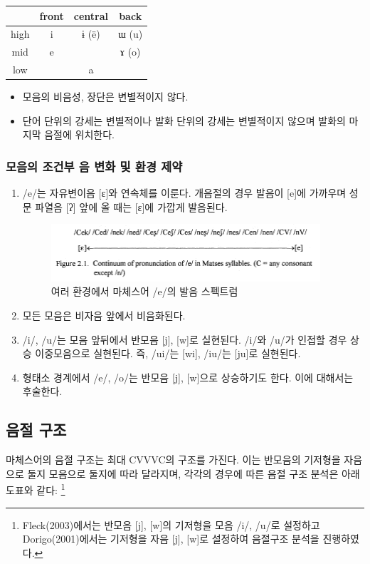 \begin{center}
\begin{tabular}{|c|c|c|c|}
\hline
	& front	& central	& back	\\ \hline
high	& i 		& ɨ  (ë)	& ɯ	(u)	\\ \hline
mid	& e		& 		& ɤ	(o)	\\ \hline
low	& 		& a 		&		\\
\hline
\end{tabular}
\end{center}

\begin{itemize}
\item 모음의 비음성, 장단은 변별적이지 않다. 
\item 단어 단위의 강세는 변별적이나 발화 단위의 강세는 변별적이지 않으며 발화의 마지막 음절에 위치한다. 
\end{itemize}

\subsubsection{모음의 조건부 음 변화 및 환경 제약}
\begin{enumerate}
\item /e/는 자유변이음 [ɛ]와 연속체를 이룬다. 개음절의 경우 발음이 [e]에 가까우며 성문 파열음 [ʔ] 앞에 올 때는 [ɛ]에 가깝게 발음된다. 

\begin{figure}
	\centering
		\includegraphics[width=100mm]{Matses/src/matses1.png}
		\caption{여러 환경에서 마체스어 /e/의 발음 스펙트럼}
\end{figure}
\item 모든 모음은 비자음 앞에서 비음화된다. 
\item /i/, /u/는 모음 앞뒤에서 반모음 [j], [w]로 실현된다. /i/와 /u/가 인접할 경우 상승 이중모음으로 실현된다. 즉, /ui/는 [wi], /iu/는 [ju]로 실현된다.  
\item 형태소 경계에서 /e/, /o/는 반모음 [j], [w]으로 상승하기도 한다. 이에 대해서는 후술한다. 
\end{enumerate}

\subsection{음절 구조}
마체스어의 음절 구조는 최대 CVVVC의 구조를 가진다. 이는 반모음의 기저형을 자음으로 둘지 모음으로 둘지에 따라 달라지며, 각각의 경우에 따른 음절 구조 분석은 아래 도표와 같다: 
\footnote{Fleck(2003)에서는 반모음 [j], [w]의 기저형을 모음 /i/, /u/로 설정하고 Dorigo(2001)에서는 기저형을 자음 [j], [w]로 설정하여 음절구조 분석을 진행하였다.}

